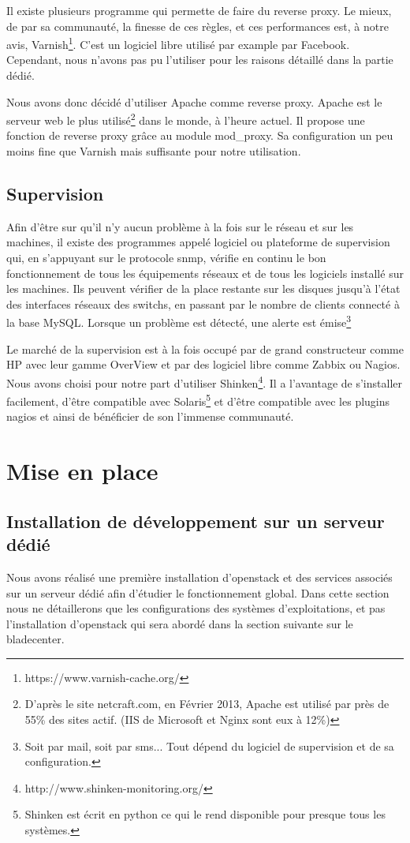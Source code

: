 \documentclass[a4paper,oneside]{report}
\begin{document}
Il existe plusieurs programme qui permette de faire du reverse proxy.
Le mieux, de par sa communauté, la finesse de ces règles, et ces performances est, à notre avis, Varnish\footnote{https://www.varnish-cache.org/}.
C'est un logiciel libre utilisé par example par Facebook. Cependant, nous n'avons pas pu l'utiliser pour les raisons détaillé dans la partie dédié.

Nous avons donc décidé d'utiliser Apache comme reverse proxy. Apache est le serveur web le plus utilisé\footnote{D'après le site netcraft.com, en Février 2013, Apache est utilisé par près de 55\% des sites actif. (IIS de Microsoft et Nginx sont eux à 12\%)} dans le monde, à l'heure actuel.
Il propose une fonction de reverse proxy grâce au module mod\_proxy. Sa configuration un peu moins fine que Varnish mais suffisante pour notre utilisation.

\section{Supervision}
Afin d'être sur qu'il n'y aucun problème à la fois sur le réseau et sur les machines, il existe des programmes appelé logiciel ou plateforme de supervision qui, en s'appuyant sur le protocole snmp, vérifie en continu le bon fonctionnement de tous les équipements réseaux et de tous les logiciels installé sur les machines.
Ils peuvent vérifier de la place restante sur les disques jusqu'à l'état des interfaces réseaux des switchs, en passant par le nombre de clients connecté à la base MySQL.
Lorsque un problème est détecté, une alerte est émise\footnote{Soit par mail, soit par sms... Tout dépend du logiciel de supervision et de sa configuration.}

Le marché de la supervision est à la fois occupé par de grand constructeur comme HP avec leur gamme OverView et par des logiciel libre comme Zabbix ou Nagios.
Nous avons choisi pour notre part d'utiliser Shinken\footnote{http://www.shinken-monitoring.org/}.
Il a l'avantage de s'installer facilement, d'être compatible avec Solaris\footnote{Shinken est écrit en python ce qui le rend disponible pour presque tous les systèmes.} et d'être compatible avec les plugins nagios et ainsi de bénéficier de son l'immense communauté.



\chapter{Mise en place} \label{cha:miseenplace}
\section{Installation de développement sur un serveur dédié}
Nous avons réalisé une première installation d'\gls{openstack} et des services associés sur un serveur dédié afin d'étudier le fonctionnement global.
Dans cette section nous ne détaillerons que les configurations des systèmes d'exploitations, et pas l'installation d'\gls{openstack} qui sera abordé dans la section suivante sur le \gls{bladecenter}.
\end{document}
